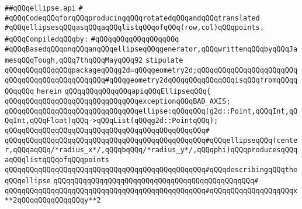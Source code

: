\label{src/lib/x-kit/draw/ellipse.api}
\verb|##qQQqellipse.api|\newline
\verb|#|\newline
\verb|#qQQqCodeqQQqforqQQqproducingqQQqrotatedqQQqandqQQqtranslated|\newline
\verb|#qQQqellipsesqQQqasqQQqaqQQqlistqQQqofqQQq(row,col)qQQqpoints.|\newline
\newline
\verb|#qQQqCompiledqQQqby:|\newline
\verb|#qQQqqQQqqQQqqQQqqQQq|\newline
\newline
\newline
\newline
\newline
\verb|#qQQqBasedqQQqonqQQqanqQQqellipseqQQqgenerator,qQQqwrittenqQQqbyqQQqJamesqQQqTough,qQQq7thqQQqMayqQQq92|\newline
\newline
\verb|stipulate|\newline
\verb|qQQqqQQqqQQqqQQqpackageqQQqg2d=qQQqgeometry2d;qQQqqQQqqQQqqQQqqQQqqQQqqQQqqQQqqQQqqQQqqQQqqQQq#qQQqgeometry2dqQQqqQQqqQQqqQQqisqQQqfromqQQqqQQqqQQq|\newline
\verb|herein|\newline
\newline
\verb|qQQqqQQqqQQqqQQqapiqQQqEllipseqQQq{|\newline
\newline
\verb|qQQqqQQqqQQqqQQqqQQqqQQqqQQqqQQqexceptionqQQqBAD_AXIS;|\newline
\newline
\verb|qQQqqQQqqQQqqQQqqQQqqQQqqQQqqQQqellipse:qQQqqQQq(g2d::Point,qQQqInt,qQQqInt,qQQqFloat)qQQq->qQQqList(qQQqg2d::PointqQQq);|\newline
\verb|qQQqqQQqqQQqqQQqqQQqqQQqqQQqqQQqqQQqqQQqqQQqqQQq#|\newline
\verb|qQQqqQQqqQQqqQQqqQQqqQQqqQQqqQQqqQQqqQQqqQQqqQQq#qQQqellipseqQQq(center,qQQqaqQQq/*radius_x*/,qQQqbqQQq/*radius_y*/,qQQqphi)qQQqproducesqQQqaqQQqlistqQQqofqQQqpoints|\newline
\verb|qQQqqQQqqQQqqQQqqQQqqQQqqQQqqQQqqQQqqQQqqQQqqQQq#qQQqdescribingqQQqtheqQQqellipse|\newline
\verb|qQQqqQQqqQQqqQQqqQQqqQQqqQQqqQQqqQQqqQQqqQQqqQQq#|\newline
\verb|qQQqqQQqqQQqqQQqqQQqqQQqqQQqqQQqqQQqqQQqqQQqqQQq#qQQqqQQqqQQqqQQqqQQqx**2qQQqqQQqqQQqqQQqy**2|\newline
